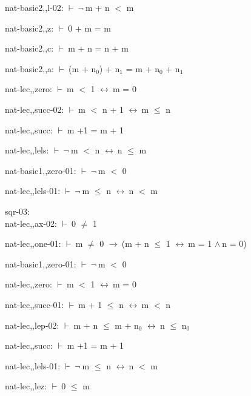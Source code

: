 \documentclass[a4paper]{article}
\newcommand{\Fol}{\mbox{$\vdash\ $}}
\newcommand{\Not}{\mbox{$\neg\ $}}
\newcommand{\And}{\mbox{$\wedge\ $}}
\newcommand{\Imp}{\mbox{$\rightarrow\ $}}
\newcommand{\Equiv}{\mbox{$\leftrightarrow\ $}}
\begin{document}
nat-basic2,,l-02: 
 \Fol \Not m + n $<$ m



nat-basic2,,z: 
 \Fol 0 + m = m



nat-basic2,,c: 
 \Fol m + n = n + m



nat-basic2,,a: 
 \Fol (m + $\mbox{n}_{0}$) + $\mbox{n}_{1}$ = m + $\mbox{n}_{0}$ + $\mbox{n}_{1}$



nat-lec,,zero: 
 \Fol m $<$ 1 \Equiv m = 0



nat-lec,,succ-02: 
 \Fol m $<$ n + 1 \Equiv m $\le$ n



nat-lec,,succ: 
 \Fol m +1 = m + 1



nat-lec,,lels: 
 \Fol \Not m $<$ n \Equiv n $\le$ m



nat-basic1,,zero-01: 
 \Fol \Not m $<$ 0



nat-lec,,lels-01: 
 \Fol \Not m $\le$ n \Equiv n $<$ m



\bigskip

sqr-03:\\ nat-lec,,ax-02: 
 \Fol 0 $\neq$ 1



nat-lec,,one-01: 
 \Fol m $\neq$ 0 \Imp (m + n $\le$ 1 \Equiv m = 1 \And n = 0)



nat-basic1,,zero-01: 
 \Fol \Not m $<$ 0



nat-lec,,zero: 
 \Fol m $<$ 1 \Equiv m = 0



nat-lec,,succ-01: 
 \Fol m + 1 $\le$ n \Equiv m $<$ n



nat-lec,,lep-02: 
 \Fol m + n $\le$ m + $\mbox{n}_{0}$ \Equiv n $\le$ $\mbox{n}_{0}$



nat-lec,,succ: 
 \Fol m +1 = m + 1



nat-lec,,lels-01: 
 \Fol \Not m $\le$ n \Equiv n $<$ m



nat-lec,,lez: 
 \Fol 0 $\le$ m
\end{document}
